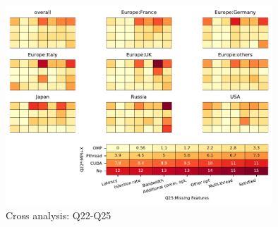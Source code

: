 \begin{figure}[htb]
\begin{center}
\includegraphics[width=10cm]{../pdfs/Q22-Q25.pdf}
\caption{Cross analysis: Q22-Q25}
\label{fig:Q25-and-Q22}
\end{center}
\end{figure}

